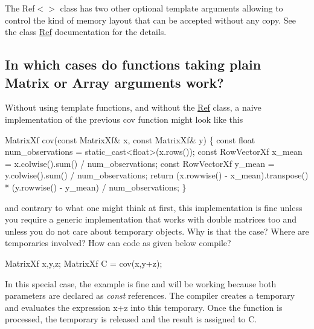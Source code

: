  The Ref$<$$>$ class has two other optional template arguments allowing to control the kind of memory layout that can be accepted without any copy. See the class \hyperlink{group___core___module_class_eigen_1_1_ref}{Ref} documentation for the details.\hypertarget{_topic_function_taking_eigen_types_TopicPlainFunctionsWorking}{}\subsection{In which cases do functions taking plain Matrix or Array arguments work?}\label{_topic_function_taking_eigen_types_TopicPlainFunctionsWorking}
Without using template functions, and without the \hyperlink{group___core___module_class_eigen_1_1_ref}{Ref} class, a naive implementation of the previous cov function might look like this 
\begin{DoxyCode}
MatrixXf cov(\textcolor{keyword}{const} MatrixXf& x, \textcolor{keyword}{const} MatrixXf& y)
\{
  \textcolor{keyword}{const} \textcolor{keywordtype}{float} num\_observations = \textcolor{keyword}{static\_cast<}\textcolor{keywordtype}{float}\textcolor{keyword}{>}(x.rows());
  \textcolor{keyword}{const} RowVectorXf x\_mean = x.colwise().sum() / num\_observations;
  \textcolor{keyword}{const} RowVectorXf y\_mean = y.colwise().sum() / num\_observations;
  \textcolor{keywordflow}{return} (x.rowwise() - x\_mean).transpose() * (y.rowwise() - y\_mean) / num\_observations;
\}
\end{DoxyCode}
 and contrary to what one might think at first, this implementation is fine unless you require a generic implementation that works with double matrices too and unless you do not care about temporary objects. Why is that the case? Where are temporaries involved? How can code as given below compile? 
\begin{DoxyCode}
MatrixXf x,y,z;
MatrixXf C = cov(x,y+z);
\end{DoxyCode}
 In this special case, the example is fine and will be working because both parameters are declared as {\itshape const} references. The compiler creates a temporary and evaluates the expression x+z into this temporary. Once the function is processed, the temporary is released and the result is assigned to C.

